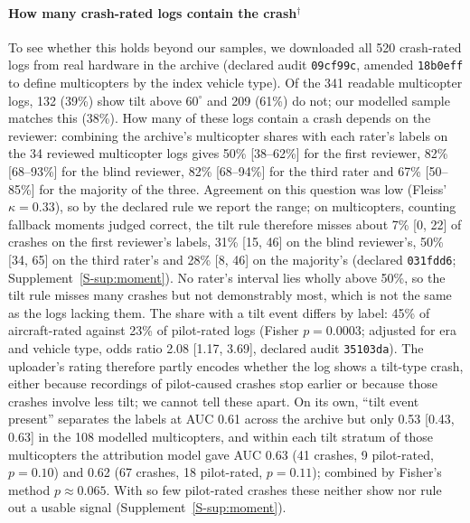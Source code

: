 \documentclass[preprint,12pt]{elsarticle}
\begin{document}
\paragraph{How many crash-rated logs contain the crash$^\dagger$}
\label{sec:archivelabels}
To see whether this holds beyond our samples, we downloaded all 520 crash-rated logs from real hardware in the archive (declared audit \texttt{09cf99c}, amended \texttt{18b0eff} to define multicopters by the index vehicle type). Of the 341 readable multicopter logs, 132 (39\%) show tilt above $60^\circ$ and 209 (61\%) do not; our modelled sample matches this (38\%). How many of these logs contain a crash depends on the reviewer: combining the archive's multicopter shares with each rater's labels on the 34 reviewed multicopter logs gives 50\% [38--62\%] for the first reviewer, 82\% [68--93\%] for the blind reviewer, 82\% [68--94\%] for the third rater and 67\% [50--85\%] for the majority of the three. Agreement on this question was low (Fleiss' $\kappa=0.33$), so by the declared rule we report the range; on multicopters, counting fallback moments judged correct, the tilt rule therefore misses about 7\% [0, 22] of crashes on the first reviewer's labels, 31\% [15, 46] on the blind reviewer's, 50\% [34, 65] on the third rater's and 28\% [8, 46] on the majority's (declared \texttt{031fdd6}; Supplement~\ref{S-sup:moment}). No rater's interval lies wholly above 50\%, so the tilt rule misses many crashes but not demonstrably most, which is not the same as the logs lacking them. The share with a tilt event differs by label: 45\% of aircraft-rated against 23\% of pilot-rated logs (Fisher $p=0.0003$; adjusted for era and vehicle type, odds ratio 2.08 [1.17, 3.69], declared audit \texttt{35103da}). The uploader's rating therefore partly encodes whether the log shows a tilt-type crash, either because recordings of pilot-caused crashes stop earlier or because those crashes involve less tilt; we cannot tell these apart. On its own, ``tilt event present'' separates the labels at AUC 0.61 across the archive but only 0.53 [0.43, 0.63] in the 108 modelled multicopters, and within each tilt stratum of those multicopters the attribution model gave AUC 0.63 (41 crashes, 9 pilot-rated, $p=0.10$) and 0.62 (67 crashes, 18 pilot-rated, $p=0.11$); combined by Fisher's method $p\approx0.065$. With so few pilot-rated crashes these neither show nor rule out a usable signal (Supplement~\ref{S-sup:moment}).

\FloatBarrier
\end{document}
